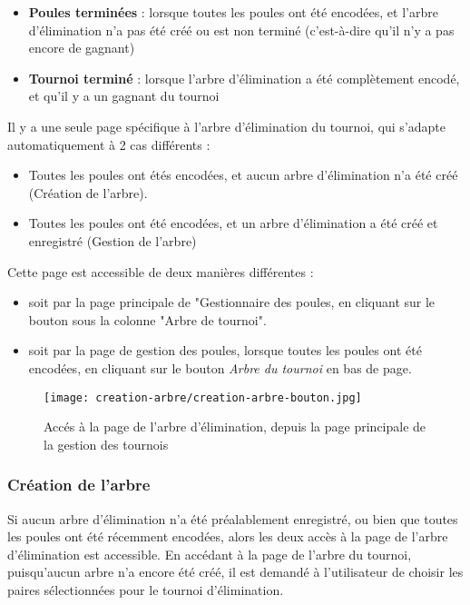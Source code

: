 \begin{itemize}
\item \textbf{Poules terminées} : lorsque toutes les poules ont été encodées, et l'arbre d'élimination n'a pas été créé ou est non terminé (c'est-à-dire qu'il n'y a pas encore de gagnant)
\item \textbf{Tournoi terminé} : lorsque l'arbre d'élimination a été complètement encodé, et qu'il y a un gagnant du tournoi
\end{itemize}
\bigskip

Il y a une seule page spécifique à l'arbre d'élimination du tournoi, qui s'adapte automatiquement à 2 cas différents :

\begin{itemize}
\item Toutes les poules ont étés encodées, et aucun arbre d'élimination n'a été créé (Création de l'arbre).
\item Toutes les poules ont été encodées, et un arbre d'élimination a été créé et enregistré (Gestion de l'arbre)
\end{itemize}
\bigskip

Cette page est accessible de deux manières différentes :

\begin{itemize}
\item soit par la page principale de "Gestionnaire des poules, en cliquant sur le bouton sous la colonne "Arbre de tournoi".
\item soit par la page de gestion des poules, lorsque toutes les poules ont été encodées, en cliquant sur le bouton \textit{Arbre du tournoi} en bas de page.
\end{itemize}
\bigskip

\begin{figure}[H]
\centering
\texttt{[image: creation-arbre/creation-arbre-bouton.jpg]}
\caption{Accés à la page de l'arbre d'élimination, depuis la page principale de la gestion des tournois}
\end{figure}

\subsubsection{Création de l'arbre}

Si aucun arbre d'élimination n'a été préalablement enregistré, ou bien que toutes les poules ont été récemment encodées, alors les deux accès à la page de l'arbre d'élimination est accessible. En accédant à la page de l'arbre du tournoi, puisqu'aucun arbre n'a encore été créé, il est demandé à l'utilisateur de choisir les paires sélectionnées pour le tournoi d'élimination.


